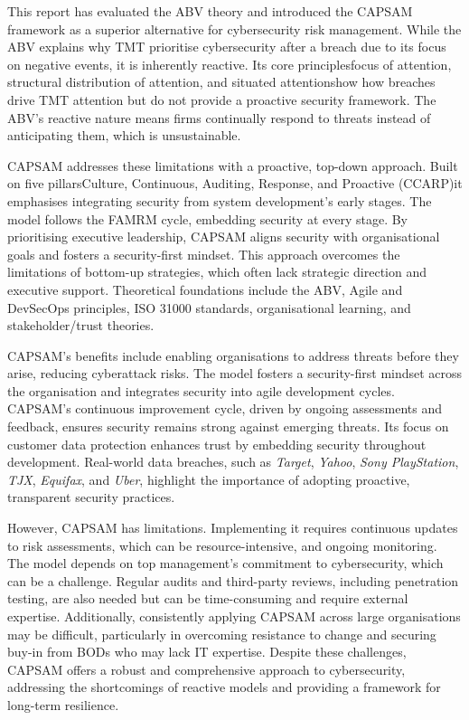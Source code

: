 This report has evaluated the ABV theory and introduced the CAPSAM framework as a superior alternative for cybersecurity risk management. While the ABV explains why TMT prioritise cybersecurity after a breach due to its focus on negative events, it is inherently reactive. Its core principles\textendash focus of attention, structural distribution of attention, and situated attention\textendash show how breaches drive TMT attention but do not provide a proactive security framework. The ABV's reactive nature means firms continually respond to threats instead of anticipating them, which is unsustainable.

CAPSAM addresses these limitations with a proactive, top-down approach. Built on five pillars\textendash Culture, Continuous, Auditing, Response, and Proactive (CCARP)\textendash it emphasises integrating security from system development's early stages. The model follows the FAMRM cycle, embedding security at every stage. By prioritising executive leadership, CAPSAM aligns security with organisational goals and fosters a security-first mindset. This approach overcomes the limitations of bottom-up strategies, which often lack strategic direction and executive support. Theoretical foundations include the ABV, Agile and DevSecOps principles, ISO 31000 standards, organisational learning, and stakeholder/trust theories.

CAPSAM's benefits include enabling organisations to address threats before they arise, reducing cyberattack risks. The model fosters a security-first mindset across the organisation and integrates security into agile development cycles. CAPSAM's continuous improvement cycle, driven by ongoing assessments and feedback, ensures security remains strong against emerging threats. Its focus on customer data protection enhances trust by embedding security throughout development. Real-world data breaches, such as \textit{Target}, \textit{Yahoo}, \textit{Sony PlayStation}, \textit{TJX}, \textit{Equifax}, and \textit{Uber}, highlight the importance of adopting proactive, transparent security practices.

However, CAPSAM has limitations. Implementing it requires continuous updates to risk assessments, which can be resource-intensive, and ongoing monitoring. The model depends on top management's commitment to cybersecurity, which can be a challenge. Regular audits and third-party reviews, including penetration testing, are also needed but can be time-consuming and require external expertise. Additionally, consistently applying CAPSAM across large organisations may be difficult, particularly in overcoming resistance to change and securing buy-in from BODs who may lack IT expertise. Despite these challenges, CAPSAM offers a robust and comprehensive approach to cybersecurity, addressing the shortcomings of reactive models and providing a framework for long-term resilience.